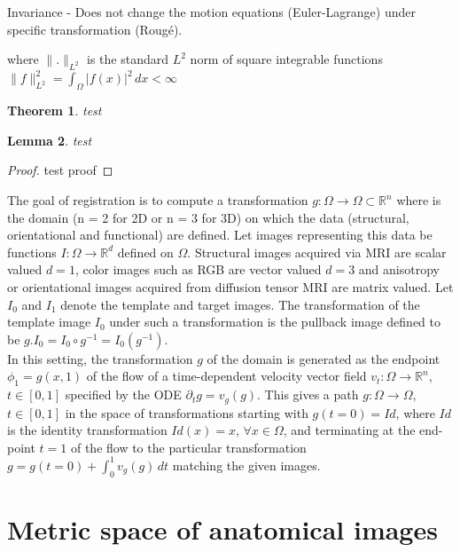 \documentclass[preprint,review,8pt,times]{elsarticle}
\newtheorem{theorem}{Theorem}%
\newtheorem{lemma}[theorem]{Lemma}
\begin{document}
\begin{definition}
Invariance - Does not change the motion equations (Euler-Lagrange) under specific transformation (Roug\'e).
\end{definition}
where $\| . \|_{L^{2}}$ is the standard $L^{2}$ norm of square integrable functions $\| f \|_{L^{2}}^{2} = \int_{\Omega}  |f(x)|^{2} \, dx < \infty$

\begin{theorem}
test
\end{theorem}
\begin{lemma}
test
\end{lemma}
\begin{proof}
test proof
\end{proof}

The goal of registration is to compute a transformation $g:\Omega \rightarrow \Omega \subset \mathbb{R}^{n}$ where is the domain (n = 2 for 2D or n = 3 for 3D) on which the data (structural, orientational and functional) are defined. Let images representing this data be functions $I: \Omega \rightarrow \mathbb{R}^{d}$ defined on $\Omega$. Structural images acquired via MRI are scalar valued $d = 1$, color images such as RGB are vector valued $d = 3$ and anisotropy or orientational images acquired from diffusion tensor MRI are matrix valued. Let $I_{0}$ and $I_{1}$ denote the template and target images. The transformation of the template image $I_{0}$ under such a transformation is the pullback image defined to be $g.I_{0} = I_{0} \circ g^{-1} = I_{0}(g^{-1})$.\\
In this setting, the transformation $g$ of the domain is generated as the endpoint $\phi_{1} = g(x,1)$ of the flow of a time-dependent velocity vector field $v_{t}: \Omega \rightarrow \mathbb{R}^{n}$, $t \in [0, 1]$ specified by the ODE $\partial_{t} g = v_{g}(g)$. This gives a path $g: \Omega \rightarrow \Omega$, $t \in [0, 1]$ in the space of transformations starting with $g(t = 0) = Id$, where $Id$ is the identity transformation $Id(x) = x$, $\forall x \in \Omega$, and terminating at the end-point $t = 1$ of the flow to the particular transformation $g = g( t = 0 ) + \int_{0}^{1} v_{g}(g) \, dt$ matching the given images.

\section{Metric space of anatomical images}
\end{document}
